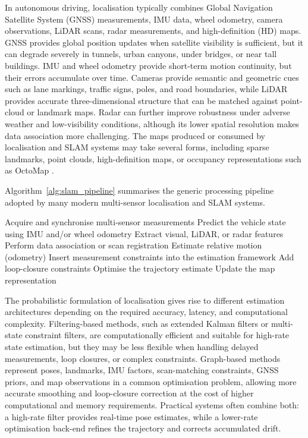 In autonomous driving, localisation typically combines Global Navigation Satellite System (GNSS) measurements, IMU data, wheel odometry, camera observations, LiDAR scans, radar measurements, and high-definition (HD) maps. GNSS provides global position updates when satellite visibility is sufficient, but it can degrade severely in tunnels, urban canyons, under bridges, or near tall buildings. IMU and wheel odometry provide short-term motion continuity, but their errors accumulate over time. Cameras provide semantic and geometric cues such as lane markings, traffic signs, poles, and road boundaries, while LiDAR provides accurate three-dimensional structure that can be matched against point-cloud or landmark maps. Radar can further improve robustness under adverse weather and low-visibility conditions, although its lower spatial resolution makes data association more challenging. The maps produced or consumed by localisation and SLAM systems may take several forms, including sparse landmarks, point clouds, high-definition maps, or occupancy representations such as OctoMap \cite{hornung2013_octomap}.

Algorithm~\ref{alg:slam_pipeline} summarises the generic processing pipeline adopted by many modern multi-sensor localisation and SLAM systems.

\begin{algorithm}[t]
\caption{Generic Multi-Sensor Localisation and SLAM Pipeline}
\label{alg:slam_pipeline}
\begin{algorithmic}[1]
\State Acquire and synchronise multi-sensor measurements
\State Predict the vehicle state using IMU and/or wheel odometry
\State Extract visual, LiDAR, or radar features
\State Perform data association or scan registration
\State Estimate relative motion (odometry)
\State Insert measurement constraints into the estimation framework
    \State Add loop-closure constraints
\EndIf
\State Optimise the trajectory estimate
\State Update the map representation
\end{algorithmic}
\end{algorithm}

The probabilistic formulation of localisation gives rise to different estimation architectures depending on the required accuracy, latency, and computational complexity. Filtering-based methods, such as extended Kalman filters or multi-state constraint filters, are computationally efficient and suitable for high-rate state estimation, but they may be less flexible when handling delayed measurements, loop closures, or complex constraints. Graph-based methods represent poses, landmarks, IMU factors, scan-matching constraints, GNSS priors, and map observations in a common optimisation problem, allowing more accurate smoothing and loop-closure correction at the cost of higher computational and memory requirements. Practical systems often combine both: a high-rate filter provides real-time pose estimates, while a lower-rate optimisation back-end refines the trajectory and corrects accumulated drift.


